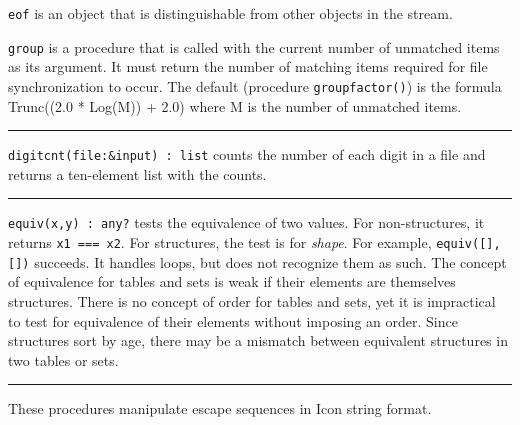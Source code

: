 \texttt{eof} is an object that is distinguishable from other objects in
the stream.

\texttt{group} is a procedure that is called with the current number of
unmatched items as its argument. It must return the number of matching
items required for file synchronization to occur. The default
(procedure \texttt{groupfactor()}) is the formula Trunc((2.0 * Log(M))
+ 2.0) where M is the number of unmatched items.

\vspace{0.25cm}\hrule{}

\texttt{digitcnt(file:\&input) : list} counts the number of each digit
in a file and returns a ten-element list with the counts. 



\vspace{0.25cm}\hrule{}

\texttt{equiv(x,y) : any?} tests the equivalence of two values. For
non-structures, it returns \texttt{x1 === x2}. For structures, the test
is for \textit{shape}. For example,
\texttt{equiv([],[])} succeeds. It handles loops, but does not
recognize them as such. The concept of equivalence for tables and sets
is weak if their elements are themselves structures. There
is no concept of order for tables and sets, yet it is impractical to
test for equivalence of their elements without imposing an order. Since
structures sort by {\textquotedbl}age{\textquotedbl}, there may be a
mismatch between equivalent structures in two tables or sets. 

\vspace{0.25cm}\hrule{}

These procedures manipulate escape sequences in
Icon string format.

